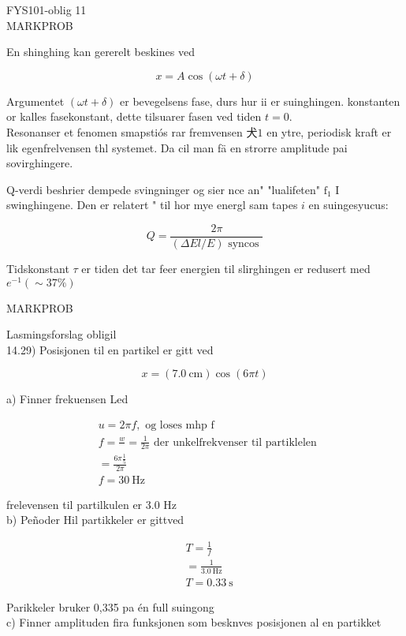 \documentclass[10pt]{article}
\begin{document}
FYS101-oblig 11\\

MARKPROB

En shinghing kan gererelt beskines ved

$$
x=A \cos (\omega t+\delta)
$$

Argumentet $(\omega t+\delta)$ er bevegelsens fase, durs hur ii er suinghingen. konstanten or kalles fasekonstant, dette tilsuarer fasen ved tiden $t=0$.\\
Resonanser et fenomen smapstiós rar fremvensen $犬 1$ en ytre, periodisk kraft er lik egenfrelvensen thl systemet. Da cil man fä en strorre amplitude pai sovirghingere.

Q-verdi beshrier dempede svingninger og sier nce an" "lualifeten" $\mathrm{f}_{1}$ I swinghingene. Den er relatert " til hor mye energl sam tapes $i$ en suingesyucus:

$$
Q=\frac{2 \pi}{(\Delta E l / E) \text { syncos }}
$$

Tidskonstant $\tau$ er tiden det tar feer energien til slirghingen er redusert med $e^{-1}(\sim 37 \%)$

MARKPROB

Lasmingsforslag obligil\\
14.29) Posisjonen til en partikel er gitt ved

$$
x=(7.0 \mathrm{~cm}) \cos (6 \pi t)
$$

a) Finner frekuensen Led

$$
\begin{aligned}
& u=2 \pi f, \text { og loses mhp f } \\
& f=\frac{w}{}=\frac{1}{2 \pi} \text { der unkelfrekvenser til partiklelen } \\
& =\frac{6 \pi \frac{1}{5}}{2 \pi} \\
& f=30 \mathrm{~Hz}
\end{aligned}
$$

frelevensen til partilkulen er 3.0 Hz\\
b) Peñoder Hil partikkeler er gittved

$$
\begin{aligned}
& T=\frac{1}{f} \\
& =\frac{1}{3.0 \mathrm{~Hz}} \\
& T=0.33 \mathrm{~s}
\end{aligned}
$$

Parikkeler bruker 0,335 pa én full suingong\\
c) Finner amplituden fira funksjonen som besknves posisjonen al en partikket
\end{document}
